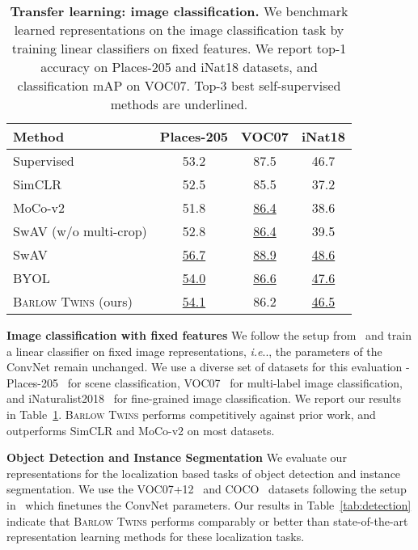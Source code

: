 \documentclass{article}
\makeatletter
\newcommand{\AlgoName}{\textsc{Barlow Twins}}
\DeclareRobustCommand\onedot{\futurelet\@let@token\@onedot}
\def\@onedot{\ifx\@let@token.\else.\null\fi\xspace}
\def\ie{\emph{i.e}\onedot} \def\Ie{\emph{I.e}\onedot}
\makeatother
\begin{document}
\begin{table}[ht]
\caption{\textbf{Transfer learning: image classification.} We benchmark learned representations on the image classification task by training linear classifiers on fixed features. We report top-1 accuracy on Places-205 and iNat18 datasets, and classification mAP on VOC07. Top-3 best self-supervised methods are underlined.}
\label{tab:linear_transfer}
\vskip 0.15in
\begin{center}
\begin{tabular}{@{}lccc@{}}
\toprule
Method & Places-205 & VOC07 & iNat18 \\
\midrule
Supervised & 53.2 & 87.5 & 46.7\\
\midrule
SimCLR & 52.5 & 85.5 & 37.2 \\
MoCo-v2 & 51.8 & \underline{86.4} & 38.6 \\
SwAV (w/o multi-crop) & 52.8 & \underline{86.4} & 39.5 \\
SwAV & \underline{56.7} & \underline{88.9} & \underline{48.6} \\
BYOL & \underline{54.0} & \underline{86.6} & \underline{47.6} \\
\AlgoName{} (ours) & \underline{54.1} & 86.2 & \underline{46.5} \\
\bottomrule
\end{tabular}
\end{center}
\vskip -0.1in
\end{table} 
\par \noindent \textbf{Image classification with fixed features} We follow the setup from~\cite{misra2019self} and train a linear classifier on fixed image representations, \ie, the parameters of the ConvNet remain unchanged. We use a diverse set of datasets for this evaluation - Places-205~\cite{zhou2014learning} for scene classification, VOC07~\cite{everingham2010pascal} for multi-label image classification, and iNaturalist2018~\cite{van2018inaturalist} for fine-grained image classification. We report our results in Table~\ref{tab:linear_transfer}. \AlgoName{} performs competitively against prior work, and outperforms SimCLR and MoCo-v2 on most datasets.


\par \noindent \textbf{Object Detection and Instance Segmentation} We evaluate our representations for the localization based tasks of object detection and instance segmentation. We use the VOC07+12~\cite{everingham2010pascal} and COCO~\cite{lin2014microsoft} datasets following the setup in~\cite{he2019momentum} which finetunes the ConvNet parameters. Our results in Table~\ref{tab:detection} indicate that \AlgoName{} performs comparably or better than state-of-the-art representation learning methods for these localization tasks.
\end{document}
